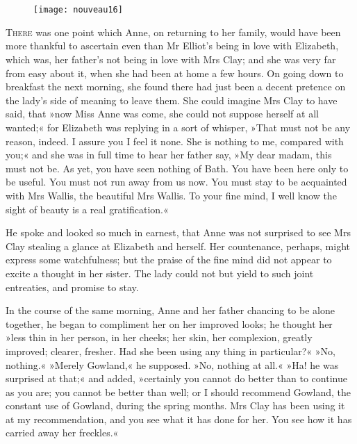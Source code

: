 \chapter[Chapter \thechapter]{}

\begin{figure}[t!]
\centering
\texttt{[image: nouveau16]}
\end{figure}

\lettrine[lines=4,lraise=0.3]{T}{here} was one point which Anne, on returning to her family, would have been more thankful to ascertain even than Mr Elliot's being in love with Elizabeth, which was, her father's not being in love with Mrs Clay; and she was very far from easy about it, when she had been at home a few hours. On going down to breakfast the next morning, she found there had just been a decent pretence on the lady's side of meaning to leave them. She could imagine Mrs Clay to have said, that »now Miss Anne was come, she could not suppose herself at all wanted;« for Elizabeth was replying in a sort of whisper, »That must not be any reason, indeed. I assure you I feel it none. She is nothing to me, compared with you;« and she was in full time to hear her father say, »My dear madam, this must not be. As yet, you have seen nothing of Bath. You have been here only to be useful. You must not run away from us now. You must stay to be acquainted with Mrs Wallis, the beautiful Mrs Wallis. To your fine mind, I well know the sight of beauty is a real gratification.«

He spoke and looked so much in earnest, that Anne was not surprised to see Mrs Clay stealing a glance at Elizabeth and herself. Her countenance, perhaps, might express some watchfulness; but the praise of the fine mind did not appear to excite a thought in her sister. The lady could not but yield to such joint entreaties, and promise to stay.

In the course of the same morning, Anne and her father chancing to be alone together, he began to compliment her on her improved looks; he thought her »less thin in her person, in her cheeks; her skin, her complexion, greatly improved; clearer, fresher. Had she been using any thing in particular?« »No, nothing.« »Merely Gowland,« he supposed. »No, nothing at all.« »Ha! he was surprised at that;« and added, »certainly you cannot do better than to continue as you are; you cannot be better than well; or I should recommend Gowland, the constant use of Gowland, during the spring months. Mrs Clay has been using it at my recommendation, and you see what it has done for her. You see how it has carried away her freckles.«

